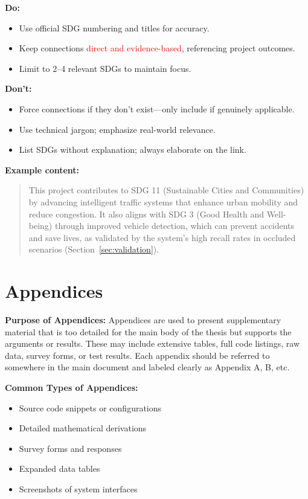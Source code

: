 \documentclass[12pt,a4paper]{report}
\theoremstyle{definition}
\theoremstyle{remark}
\begin{document}
\noindent \textbf{Do:}
\begin{itemize}
    \item Use official SDG numbering and titles for accuracy.
    \item Keep connections \textcolor{red}{direct and evidence-based}, referencing project outcomes.
    \item Limit to 2--4 relevant SDGs to maintain focus.
\end{itemize}

\noindent \textbf{Don’t:}
\begin{itemize}
    \item Force connections if they don't exist—only include if genuinely applicable.
    \item Use technical jargon; emphasize real-world relevance.
    \item List SDGs without explanation; always elaborate on the link.
\end{itemize}

\noindent \textbf{Example content:}
\begin{quote}
    This project contributes to SDG 11 (Sustainable Cities and Communities) by advancing intelligent traffic systems that enhance urban mobility and reduce congestion. It also aligns with SDG 3 (Good Health and Well-being) through improved vehicle detection, which can prevent accidents and save lives, as validated by the system's high recall rates in occluded scenarios (Section~\ref{sec:validation}).
\end{quote}

\appendix
\chapter*{Appendices}

\textbf{Purpose of Appendices:}
\noindent Appendices are used to present supplementary material that is too detailed for the main body of the thesis but supports the arguments or results. These may include extensive tables, full code listings, raw data, survey forms, or test results. Each appendix should be referred to somewhere in the main document and labeled clearly as Appendix A, B, etc.

\noindent \textbf{Common Types of Appendices:}
\begin{itemize}
    \item Source code snippets or configurations
    \item Detailed mathematical derivations
    \item Survey forms and responses
    \item Expanded data tables
    \item Screenshots of system interfaces
\end{itemize}
\end{document}
